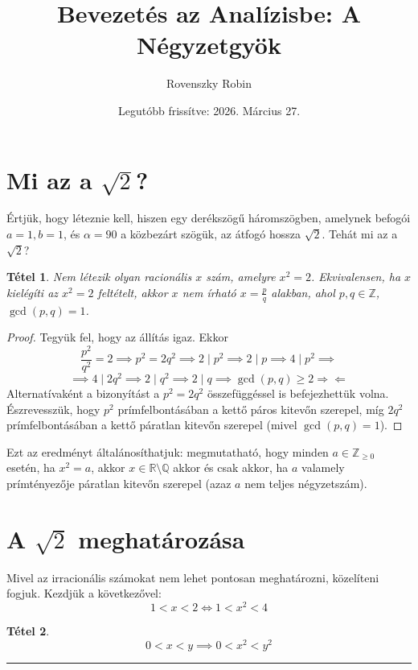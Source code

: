 \documentclass{article}
\title{Bevezetés az Analízisbe: A Négyzetgyök}
\author{Rovenszky Robin}
\date{Legutóbb frissítve: 2026. Március 27.}
\newtheorem{theorem}{Tétel}
\begin{document}
\maketitle
\tableofcontents
\newpage

\section{Mi az a $\sqrt{2}$?}
Értjük, hogy léteznie kell, hiszen egy derékszögű háromszögben, amelynek befogói $a = 1, b = 1$, és $\alpha = 90$ a közbezárt szögük, az átfogó hossza $\sqrt{2}$. Tehát mi az a $\sqrt{2}$?

\begin{theorem}
    Nem létezik olyan racionális $x$ szám, amelyre $x^2 = 2$. Ekvivalensen, ha $x$ kielégíti az $x^2 = 2$ feltételt, akkor $x$ nem írható $x = \frac{p}{q}$ alakban, ahol $p, q \in \mathbb{Z}$, $\gcd(p, q) = 1$.
\end{theorem}
\begin{proof}
    Tegyük fel, hogy az állítás igaz. Ekkor
    \begin{equation}
        \frac{p^2}{q^2} = 2 \implies p^2 = 2q^2 \implies 2 \mid p^2 \implies 2 \mid p \implies 4 \mid p^2 \implies
    \end{equation}
    \begin{equation}
        \implies 4 \mid 2q^2 \implies 2 \mid q^2 \implies 2 \mid q \implies \gcd(p, q) \ge 2 \Rightarrow\!\Leftarrow
    \end{equation}
    Alternatívaként a bizonyítást a $p^2 = 2q^2$ összefüggéssel is befejezhettük volna. Észrevesszük, hogy $p^2$ prímfelbontásában a kettő páros kitevőn szerepel, míg $2q^2$ prímfelbontásában a kettő páratlan kitevőn szerepel (mivel $\gcd(p,q) = 1$).
\end{proof}

Ezt az eredményt általánosíthatjuk: megmutatható, hogy minden $a \in \mathbb{Z}_{\ge 0}$ esetén, ha $x^2 = a$, akkor $x \in \mathbb{R} \setminus \mathbb{Q}$ akkor és csak akkor, ha $a$ valamely prímtényezője páratlan kitevőn szerepel (azaz $a$ nem teljes négyzetszám).

\section{A $\sqrt{2}$ meghatározása}
Mivel az irracionális számokat nem lehet pontosan meghatározni, közelíteni fogjuk. Kezdjük a következővel:
\[
1 < x < 2 \Leftrightarrow 1 < x^2 < 4
\]
\begin{theorem}
    \[
    0 < x < y \implies 0 < x^2 < y^2
    \]
\end{theorem}
\hrule
\vspace{1em}
\end{document}
